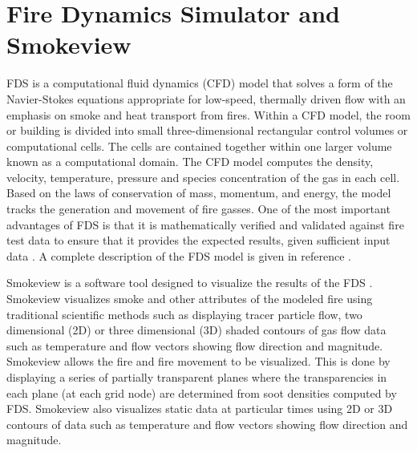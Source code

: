 \documentclass[11pt,oneside]{book}
\begin{document}
\chapter{Fire Dynamics Simulator and Smokeview}
FDS is a computational fluid dynamics (CFD) model that solves a form of the Navier-Stokes equations appropriate for low-speed, thermally driven flow with an emphasis on smoke and heat transport from fires.  Within a CFD model, the room or building is divided into small three-dimensional rectangular control volumes or computational cells.  The cells are contained together within one larger volume known as a computational domain.  The CFD model computes the density, velocity, temperature, pressure and species concentration of the gas in each cell.  Based on the laws of conservation of mass, momentum,  and energy, the model tracks the generation and movement of fire gasses. One of the most important advantages of FDS is that it is  mathematically verified \cite{FDS_Verification_Guide} and validated against fire test data to ensure that it provides the expected results, given sufficient input data \cite{FDS_Validation_Guide}.  A complete description of the FDS model is given in reference \cite{FDS_Math_Guide}.

Smokeview is a software tool designed to visualize the results of the FDS \cite{Smokeview_Users_Guide}.  Smokeview visualizes smoke and other attributes of the modeled fire using traditional scientific methods such as displaying tracer particle flow, two dimensional (2D) or three dimensional (3D) shaded contours of gas flow data such as temperature and flow vectors showing flow direction and magnitude.  Smokeview allows the fire and fire movement to be visualized.  This is done by displaying a series of partially transparent planes where the transparencies in each plane (at each grid node) are determined from soot densities computed by FDS.  Smokeview also visualizes static data at particular times using 2D or 3D contours of data such as temperature and flow vectors showing flow direction and magnitude.
\end{document}
